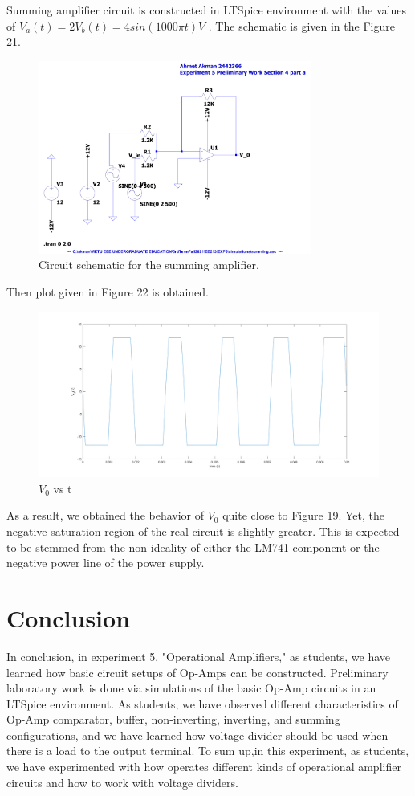 \documentclass[letterpaper,12pt]{article}
\begin{document}
Summing amplifier circuit is constructed in LTSpice environment with the values of \(V_{a}(t) = 2 V_{b}(t) = 4sin(1000\pi t) V\) . The schematic is given in the Figure 21. 
\begin{figure}[H]
	\centering
   \includegraphics[width=0.8\textwidth]{summing_SCH.pdf}
   \caption{Circuit schematic for the summing amplifier.}
\end{figure} 
Then plot given in Figure 22 is obtained.
\begin{figure}[H]
	\centering
   \includegraphics[width=1\textwidth]{4a_vs_t.png}
   \caption{\(V_0\) vs t}
\end{figure}
As a result, we obtained the behavior of \(V_0\) quite close to Figure 19.  Yet, the negative saturation region of the real circuit is slightly greater. This is expected to be stemmed from the non-ideality of either the LM741 component or the negative power line of the power supply.


\section{Conclusion}
In conclusion, in experiment 5, "Operational Amplifiers," as students, we have learned how basic circuit setups of Op-Amps can be constructed. Preliminary laboratory work is done via simulations of the basic Op-Amp circuits in an LTSpice environment. As students, we have observed different characteristics of Op-Amp comparator, buffer, non-inverting, inverting, and summing configurations, and we have learned how voltage divider should be used when there is a load to the output terminal. To sum up,in this experiment, as students, we have experimented with how operates different kinds of operational amplifier circuits and how to work with voltage dividers. 
\end{document}
